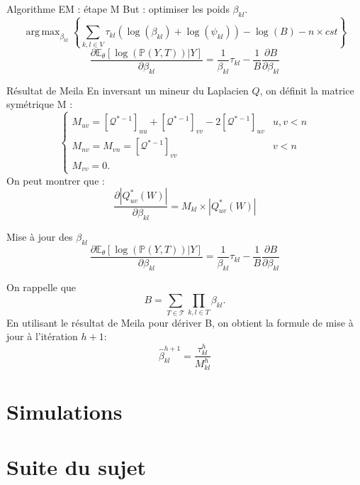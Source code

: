\documentclass{bredelebeamer}
\DeclareMathOperator*{\argmax}{arg\,max}
\begin{document}
\begin{frame}{Algorithme EM : étape M}
But : optimiser les poids $\beta_{kl}$.\\
\[\argmax_{\beta_{kl}} \left\{\sum_{k,l\in V} \tau_{kl}(\log(\beta_{kl}) + \log(\psi_{kl}) ) -\log(B) - n\times cst\right\}\]
\[ \frac{\partial\mathds{E}_\theta[\log(\mathds{P}(Y,T))|Y]}{\partial\beta_{kl}} =\frac{1 }{\beta_{kl}} \tau_{kl} - \frac{1}{B}
\frac{\partial B}{\partial\beta_{kl}}
\]

\begin{exampleblock}{Résultat de Meila \cite{MixtTrees}}
En inversant un mineur du Laplacien $Q$, on définit la matrice symétrique M : 
\[\begin{cases}
    M_{uv} = [\mathcal{Q}^{*-1}]_{uu} + [\mathcal{Q}^{*-1}]_{vv} -2[\mathcal{Q}^{*-1}]_{uv} & u,v < n\\
    M_{nv} =M_{vn} =[\mathcal{Q}^{*-1}]_{vv} & v<n\\
     M_{vv} =0.
   \end{cases}\]
On peut montrer que :
\[ \frac{\partial|Q^*_{uv}(W)|}{\partial \beta_{kl}} = M_{kl} \times |Q^*_{uv}(W)|\]
\end{exampleblock}
    
\end{frame}
 
 \begin{frame}{Mise à jour des $\beta_{kl}$}
 \[ \frac{\partial\mathds{E}_\theta[\log(\mathds{P}(Y,T))|Y]}{\partial\beta_{kl}} =\frac{1 }{\beta_{kl}} \tau_{kl} - \frac{1}{B}
\frac{\partial B}{\partial\beta_{kl}}
\]

 On rappelle que \[ B = \sum_{T\in\mathcal{T}} \prod_{k,l\in T} \beta_{kl}. \]
 En utilisant le résultat de Meila pour dériver B, on obtient la formule de mise à jour à l'itération $h+1$:
 \vspace{0.5cm}
     \[\hat{\beta}_{kl}^{h+1} = \frac{\tau_{kl}^h}{M_{kl}^h}\]
 \end{frame}
 \section{Simulations}
 \section{Suite du sujet}
\end{document}
